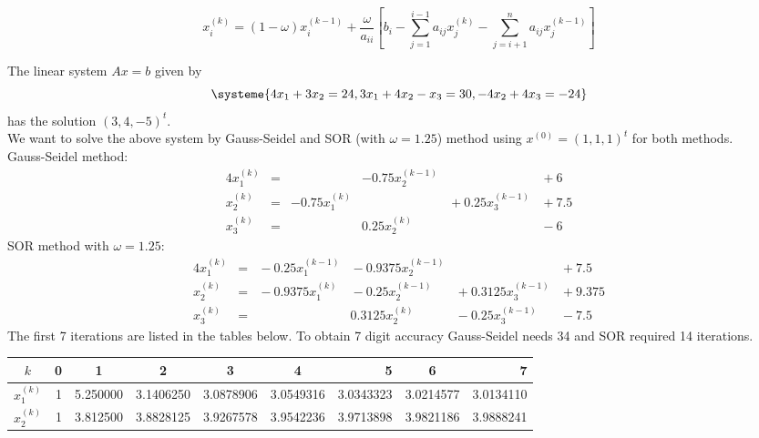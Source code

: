 \documentclass[../main-sheet.tex]{subfiles}
\begin{document}
    \begin{note}
        \[
            x_i^{(k)}= (1-\omega) x_i^{(k-1)}+\frac{\omega}{a_{ii}}\left[ b_i-\sum_{j=1}^{i-1}a_{ij}x_j^{(k)}-\sum_{j=i+1}^{n}a_{ij}x_j^{(k-1)} \right]
        \]
    \end{note}
    \begin{ex}
        The linear system \(Ax=b\) given by
        \[
            \systeme{
            4x_1+3x_2=24,
            3x_1+4x_2-x_3=30,
            -4x_2+4x_3=-24
            }
        \]
        has the solution \((3,4,-5)^t\).\\

        We want to solve the above system by Gauss-Seidel and SOR (with \(\omega=1.25\)) method using \(x^{(0)}=(1,1,1)^t\) for both methods.\\
        Gauss-Seidel method:
        \begin{alignat*}{4}
            x_1^{(k)} & {}={} &  & - 0.75 x_2^{(k-1)} & & {}+{} 6\\
            x_2^{(k)} & {}={} & -0.75 x_1^{(k)} & & {}+{} 0.25 x_3^{(k-1)}& {}+{} 7.5\\
            x_3^{(k)} & {}={} & &  0.25 x_2^{(k)} & & {}-{} 6
        \end{alignat*}
        SOR method with \(\omega=1.25\):
        \begin{alignat*}{4}
            x_1^{(k)} & {}={} & {}-{} 0.25x_1^{(k-1)} & {}-{} 0.9375 x_2^{(k-1)} & & {}+{} 7.5\\
            x_2^{(k)} & {}={} & {}-{} 0.9375 x_1^{(k)} & {}-{} 0.25x_2^{(k-1)} & {}+{} 0.3125 x_3^{(k-1)}& {}+{} 9.375\\
            x_3^{(k)} & {}={} & &  0.3125 x_2^{(k)} & {}-{} 0.25 x_3^{(k-1)}& {}-{} 7.5
        \end{alignat*}
        The first 7 iterations are listed in the tables below. To obtain 7 digit accuracy Gauss-Seidel needs 34 and SOR required 14 iterations.
        \begin{table}[H]
            \centering
            \begin{tabular}{crrrrrrrr}
            \toprule
            \(k\) & \multicolumn{1}{c}{0} & \multicolumn{1}{c}{1} & \multicolumn{1}{c}{2} & \multicolumn{1}{c}{3} & \multicolumn{1}{c}{4} & 5 & \multicolumn{1}{c}{6} & 7 \\ \midrule
            \(x_1^{(k)}\) & 1 & 5.250000 & 3.1406250 & 3.0878906 & 3.0549316 & 3.0343323 & 3.0214577 & 3.0134110 \\
            \(x_2^{(k)}\) & 1 & 3.812500 & 3.8828125 & 3.9267578 & 3.9542236 & 3.9713898 & 3.9821186 & 3.9888241 \\

\end{tabular}
\end{table}
\end{ex}
\end{document}
